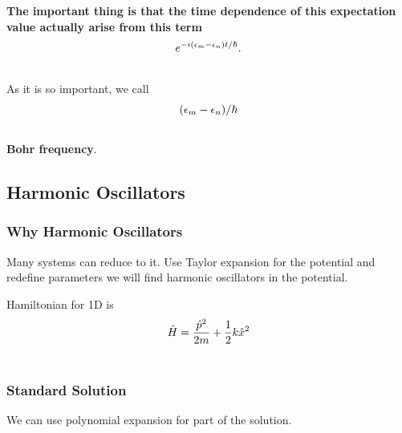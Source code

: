 \documentclass[letterpaper,10pt,english]{sphinxmanual}
\begin{document}
\textbf{The important thing is that the time dependence of this expectation value actually arise from this term}
\begin{gather}
\begin{split}e^{-i(\epsilon _ m - \epsilon _ n)t/\hbar} .\end{split}\notag\\\begin{split}\end{split}\notag
\end{gather}
As it is so important, we call
\begin{gather}
\begin{split}(\epsilon _ m - \epsilon _ n)/\hbar\end{split}\notag\\\begin{split}\end{split}\notag
\end{gather}
\textbf{Bohr frequency}.


\subsection{Harmonic Oscillators}
\label{QuantumMechanics:harmonic-oscillators}

\subsubsection{Why Harmonic Oscillators}
\label{QuantumMechanics:why-harmonic-oscillators}
Many systems can reduce to it. Use Taylor expansion for the potential and redefine parameters we will find harmonic oscillators in the potential.

Hamiltonian for 1D is
\begin{gather}
\begin{split}\hat H = \frac{\hat p^2}{2m} + \frac{1}{2} k \hat x^2\end{split}\notag\\\begin{split}\end{split}\notag
\end{gather}

\subsubsection{Standard Solution}
\label{QuantumMechanics:standard-solution}
We can use polynomial expansion for part of the solution.
\end{document}
